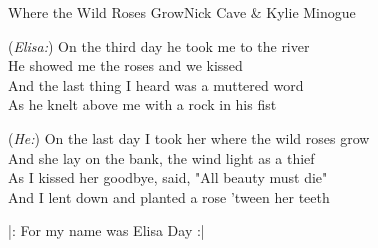 \begin{song}{Where the Wild Roses Grow}{Nick Cave \& Kylie Minogue}

\begin{guitar}
(\emph{Elisa:}) On the third day he took me to the river\\
He showed me the roses and we kissed\\
And the last thing I heard was a muttered word\\
As he knelt above me with a rock in his fist \\
\end{guitar}

\begin{guitar}
(\emph{He:}) On the last day I took her where the wild roses grow\\
And she lay on the bank, the wind light as a thief\\
As I kissed her goodbye, said, "All beauty must die"\\
And I lent down and planted a rose 'tween her teeth \\
\end{guitar}


\begin{guitar}
|: For my name was Elisa Day :|\\
\end{guitar}
\end{song}

